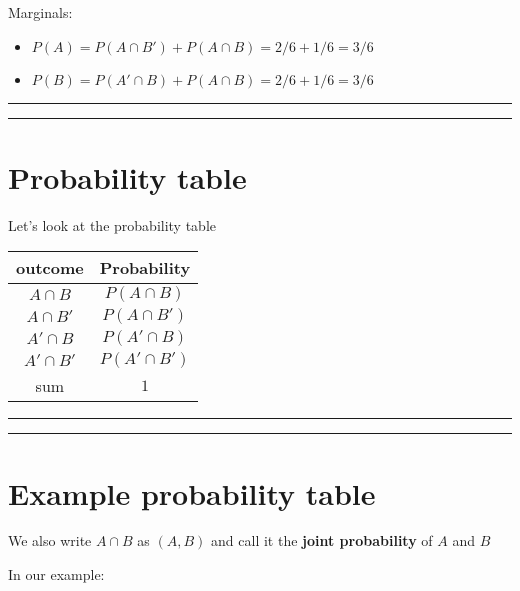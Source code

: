 \documentclass[
]{book}
\providecommand{\tightlist}{%
  \setlength{\itemsep}{0pt}\setlength{\parskip}{0pt}}
\begin{document}
Marginals:

\begin{itemize}
\tightlist
\item
  \(P(A)=P(A\cap B') + P(A \cap B)=2/6+1/6=3/6\)
\item
  \(P(B)=P(A'\cap B) +P(A \cap B)=2/6+1/6=3/6\)
\end{itemize}

\begin{center}\rule{0.5\linewidth}{0.5pt}\end{center}

\begin{center}\rule{0.5\linewidth}{0.5pt}\end{center}

\hypertarget{probability-table}{%
\section{Probability table}\label{probability-table}}

Let's look at the probability table

\begin{longtable}[]{@{}cc@{}}
\toprule
outcome & Probability \\
\midrule
\endhead
\(A\cap B\) & \(P(A\cap B)\) \\
\(A\cap B'\) & \(P(A\cap B')\) \\
\(A'\cap B\) & \(P(A'\cap B)\) \\
\(A'\cap B'\) & \(P(A'\cap B')\) \\
sum & \(1\) \\
\bottomrule
\end{longtable}

\begin{center}\rule{0.5\linewidth}{0.5pt}\end{center}

\begin{center}\rule{0.5\linewidth}{0.5pt}\end{center}

\hypertarget{example-probability-table}{%
\section{Example probability table}\label{example-probability-table}}

We also write \(A \cap B\) as \((A,B)\) and call it the \textbf{joint probability} of \(A\) and \(B\)

In our example:
\end{document}
